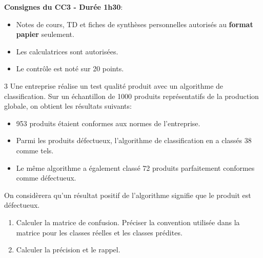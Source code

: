 \documentclass[solutions]{../cc}
\begin{document}
	
	
	\noindent \textbf{Consignes du CC3 - Durée 1h30}:
	\begin{itemize}[nosep]
		\item Notes de cours, TD et fiches de synthèses personnelles autorisés au \textbf{format papier} seulement.
		\item Les calculatrices sont autorisées.
		\item Le contrôle est noté sur 20 points.
	\end{itemize}
	
	\begin{exopoints}{3}
		Une entreprise réalise un test qualité produit avec un algorithme de classification. Sur un échantillon de 1000 produits représentatifs de la production globale, on obtient les résultats suivants:
		\begin{itemize}
			\item 953 produits étaient conformes aux normes de l'entreprise.
			\item Parmi les produits défectueux, l'algorithme de classification en a classés 38 comme tels.
			\item Le même algorithme a également classé 72 produits parfaitement conformes comme défectueux.
		\end{itemize}
		On considèrera qu'un résultat positif de l'algorithme signifie que le produit est défectueux.
		\begin{enumerate}
			\item Calculer la matrice de confusion. Préciser la convention utilisée dans la matrice pour les classes réelles et les classes prédites.
			\item Calculer la précision et le rappel.
		\end{enumerate}
	\end{exopoints}
	
\end{document}
